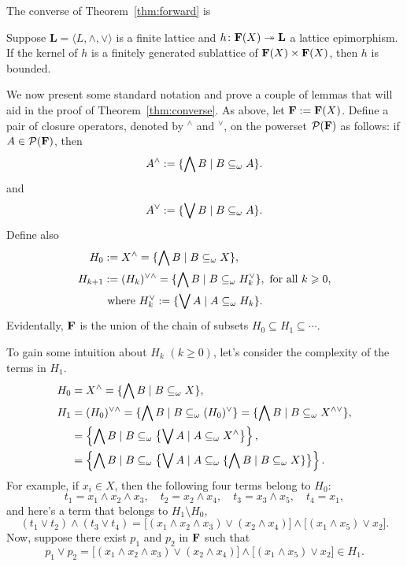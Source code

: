 The converse of Theorem~\ref{thm:forward} is
\begin{theorem}
  \label{thm:converse}
Suppose $\mathbf L = \langle L, \wedge, \vee\rangle$ is a finite lattice and 
$h\colon \mathbf{F}(X) \twoheadrightarrow \mathbf L$ a lattice epimorphism.
If the kernel of $h$ is a finitely generated sublattice 
of $\mathbf{F}(X) \times \mathbf{F}(X)$, then $h$ is bounded.
\end{theorem}
We now present some standard notation and prove a couple of lemmas that will 
aid in the proof of Theorem~\ref{thm:converse}.
As above, let $\mathbf{F}:=\mathbf{F}(X)$. 
Define a pair of closure operators, denoted by
$^\wedge$ and $^\vee$, on the powerset $\mathcal P (\mathbf{F})$ as follows: 
if $A\in \mathcal P (\mathbf{F})$, then  
\[
A^\wedge := \{\bigwedge B \mid B \subseteq_{\omega} A\}.
\]
and
\[
A^\vee := \{\bigvee B \mid B \subseteq_{\omega} A\}.
\]
Define also
\begin{align*}
  H_0 &:= X^\wedge = \{\bigwedge B \mid B \subseteq_{\omega} X\}, \\
  H_{k+1} &:= (H_k)^{\vee \wedge} = \{\bigwedge B \mid B \subseteq_{\omega} H_k^{\vee}\}, \text{ for all $k\geqslant 0$,} \\
& \text{ where } H_k^{\vee} := \{\bigvee A \mid A \subseteq_{\omega} H_k\}.
\end{align*}
Evidentally, $\mathbf{F}$ is the union of the chain of subsets 
$H_0\subseteq H_1 \subseteq \cdots$.

To gain some intuition about $H_k$ $(k\geq 0)$, let's consider the complexity 
of the terms in $H_1$. 
\begin{align*}
  H_0 &= X^\wedge = \{\bigwedge B \mid B \subseteq_{\omega} X\}, \\
  H_1 &= (H_0)^{\vee \wedge} = \{\bigwedge B \mid B \subseteq_{\omega} (H_0)^{\vee}\}= \{\bigwedge B \mid B \subseteq_{\omega} X^{\wedge \vee}\},\\
      &= \left\{\bigwedge B \mid B \subseteq_{\omega} \bigl\{\bigvee A \mid A \subseteq_{\omega} X^\wedge \bigr\}\right\},\\
      &= \left\{\bigwedge B \mid B \subseteq_{\omega} \bigl\{\bigvee A \mid A \subseteq_{\omega} \{\bigwedge B \mid B \subseteq_{\omega} X\} \bigr\}\right\}.
\end{align*}
For example, if $x_i \in X$, then the following 
four terms belong to $H_0$:
\[
t_1 = x_1 \wedge x_2 \wedge x_3, \quad t_2 = x_2 \wedge x_4, \quad t_3 = x_3 \wedge x_5, \quad t_4 = x_1,
\]
and here's a term that belongs to $H_1 \setminus H_0$,
\[
(t_1 \vee t_2) \wedge (t_3 \vee t_4) = \bigl[(x_1 \wedge x_2 \wedge x_3) \vee (x_2 \wedge x_4)\bigr] \wedge \bigl[(x_1 \wedge x_5)\vee x_2\bigr].
\]
Now, suppose there exist $p_1$ and $p_2$ in $\mathbf{F}$ such that 
\[
p_1 \vee p_2  = \bigl[(x_1 \wedge x_2 \wedge x_3) \vee (x_2 \wedge x_4)\bigr] \wedge \bigl[(x_1 \wedge x_5)\vee x_2\bigr] \in H_1.
\]


